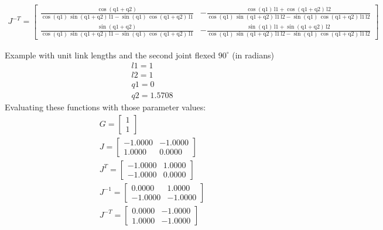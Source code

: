 \documentclass[11pt]{amsart}
\begin{document}
\begin{align}
J^{-T}=\left[\begin{array}{cc} \frac{\cos\!\left(\mathrm{q1} + \mathrm{q2}\right)}{\cos\!\left(\mathrm{q1}\right)\, \sin\!\left(\mathrm{q1} + \mathrm{q2}\right)\, \mathrm{l1} - \sin\!\left(\mathrm{q1}\right)\, \cos\!\left(\mathrm{q1} + \mathrm{q2}\right)\, \mathrm{l1}} & -\frac{\cos\!\left(\mathrm{q1}\right)\, \mathrm{l1} + \cos\!\left(\mathrm{q1} + \mathrm{q2}\right)\, \mathrm{l2}}{\cos\!\left(\mathrm{q1}\right)\, \sin\!\left(\mathrm{q1} + \mathrm{q2}\right)\, \mathrm{l1}\, \mathrm{l2} - \sin\!\left(\mathrm{q1}\right)\, \cos\!\left(\mathrm{q1} + \mathrm{q2}\right)\, \mathrm{l1}\, \mathrm{l2}}\\ \frac{\sin\!\left(\mathrm{q1} + \mathrm{q2}\right)}{\cos\!\left(\mathrm{q1}\right)\, \sin\!\left(\mathrm{q1} + \mathrm{q2}\right)\, \mathrm{l1} - \sin\!\left(\mathrm{q1}\right)\, \cos\!\left(\mathrm{q1} + \mathrm{q2}\right)\, \mathrm{l1}} & -\frac{\sin\!\left(\mathrm{q1}\right)\, \mathrm{l1} + \sin\!\left(\mathrm{q1} + \mathrm{q2}\right)\, \mathrm{l2}}{\cos\!\left(\mathrm{q1}\right)\, \sin\!\left(\mathrm{q1} + \mathrm{q2}\right)\, \mathrm{l1}\, \mathrm{l2} - \sin\!\left(\mathrm{q1}\right)\, \cos\!\left(\mathrm{q1} + \mathrm{q2}\right)\, \mathrm{l1}\, \mathrm{l2}} \end{array}\right]
\end{align}



\noindent
Example with unit link lengths and the second joint flexed $90^\circ$  (in radians)
\begin{align*}
l1 =     1 \\
l2 =     1 \\
q1 =     0 \\
q2 =    1.5708
\end{align*}
\noindent
Evaluating these functions with those parameter values:\\
\begin{align*}
G=\left[\begin{array}{r}
	1 \\
	1
	\end{array}\right] \\
J =\left[\begin{array}{rr}
	   -1.0000 &  -1.0000 \\
	    1.0000  &  0.0000
	    \end{array}\right] \\
J^T =\left[\begin{array}{rr}
	   -1.0000  &  1.0000\\
	   -1.0000  &  0.0000
	       \end{array}\right] \\
J^{-1} =\left[\begin{array}{rr}
	    0.0000  &  1.0000\\
	   -1.0000  & -1.0000
	       \end{array}\right] \\
J^{-T} =\left[\begin{array}{rr}
	    0.0000  & -1.0000\\
	    1.0000  & -1.0000
	        \end{array}\right]
\end{align*}
\end{document}
